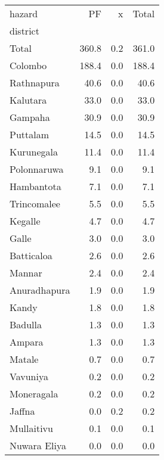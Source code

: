 \begin{tabular}{lrrr}
\toprule
hazard &     PF &    x &  Total \\
district     &        &      &        \\
\midrule
Total        &  360.8 &  0.2 &  361.0 \\
Colombo      &  188.4 &  0.0 &  188.4 \\
Rathnapura   &   40.6 &  0.0 &   40.6 \\
Kalutara     &   33.0 &  0.0 &   33.0 \\
Gampaha      &   30.9 &  0.0 &   30.9 \\
Puttalam     &   14.5 &  0.0 &   14.5 \\
Kurunegala   &   11.4 &  0.0 &   11.4 \\
Polonnaruwa  &    9.1 &  0.0 &    9.1 \\
Hambantota   &    7.1 &  0.0 &    7.1 \\
Trincomalee  &    5.5 &  0.0 &    5.5 \\
Kegalle      &    4.7 &  0.0 &    4.7 \\
Galle        &    3.0 &  0.0 &    3.0 \\
Batticaloa   &    2.6 &  0.0 &    2.6 \\
Mannar       &    2.4 &  0.0 &    2.4 \\
Anuradhapura &    1.9 &  0.0 &    1.9 \\
Kandy        &    1.8 &  0.0 &    1.8 \\
Badulla      &    1.3 &  0.0 &    1.3 \\
Ampara       &    1.3 &  0.0 &    1.3 \\
Matale       &    0.7 &  0.0 &    0.7 \\
Vavuniya     &    0.2 &  0.0 &    0.2 \\
Moneragala   &    0.2 &  0.0 &    0.2 \\
Jaffna       &    0.0 &  0.2 &    0.2 \\
Mullaitivu   &    0.1 &  0.0 &    0.1 \\
Nuwara Eliya &    0.0 &  0.0 &    0.0 \\
\bottomrule
\end{tabular}
